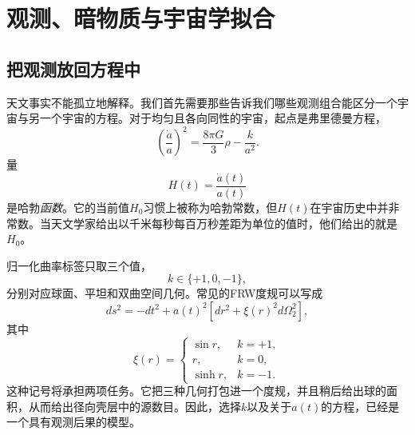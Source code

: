 \chapter{观测、暗物质与宇宙学拟合}


\section{把观测放回方程中}

天文事实不能孤立地解释。我们首先需要那些告诉我们哪些观测组合能区分一个宇宙与另一个宇宙的方程。对于均匀且各向同性的宇宙，起点是弗里德曼方程，
\begin{equation}
\left(\frac{\dot a}{a}\right)^2
=
\frac{8\pi G}{3}\rho-\frac{k}{a^2}.
\label{eq:c06-friedmann}
\end{equation}
量
\begin{equation}
H(t)=\frac{\dot a(t)}{a(t)}
\label{eq:c06-hubble}
\end{equation}
是哈勃\emph{函数}。它的当前值\(H_0\)习惯上被称为哈勃常数，但\(H(t)\)在宇宙历史中并非常数。当天文学家给出以千米每秒每百万秒差距为单位的值时，他们给出的就是\(H_0\)。

归一化曲率标签只取三个值，
\begin{equation}
k\in\{+1,0,-1\},
\end{equation}
分别对应球面、平坦和双曲空间几何。常见的FRW度规可以写成
\begin{equation}
ds^2=-dt^2+a(t)^2\left[dr^2+\xi(r)^2d\Omega_2^2\right],
\label{eq:c06-frw}
\end{equation}
其中
\begin{equation}
\xi(r)=
\begin{cases}
\sin r, & k=+1,\\
r, & k=0,\\
\sinh r, & k=-1.
\end{cases}
\label{eq:c06-xi}
\end{equation}
这种记号将承担两项任务。它把三种几何打包进一个度规，并且稍后给出球的面积，从而给出径向壳层中的源数目。因此，选择\(k\)以及关于\(a(t)\)的方程，已经是一个具有观测后果的模型。

